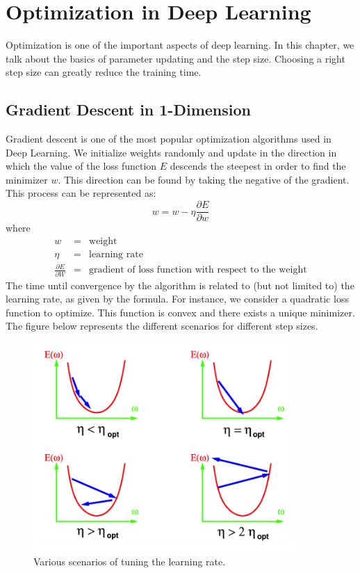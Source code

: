 
\chapter{Optimization in Deep Learning}

Optimization is one of the important aspects of deep learning. In this chapter, we talk about the basics of parameter updating and the step size. Choosing a right step size can greatly reduce the training time. 

\section{Gradient Descent in 1-Dimension}
Gradient descent is one of the most popular optimization algorithms used in Deep Learning. We initialize weights randomly and update in the direction in which the value of the loss function $E$ descends the steepest in order to find the minimizer $w$. This direction can be found by taking the negative of the gradient. This process can be represented as:
$$ w = w - \eta\frac{\partial E}{\partial w}$$
where
\begin{eqnarray*}
w &=& \text{weight}\\
\eta &=& \text{learning rate}\\
\frac{\partial E}{\partial W} &=& \text{gradient of loss function with respect to the weight}
\end{eqnarray*}
The time until convergence by the algorithm is related to (but not limited to) the learning rate, as given by the formula. For instance, we consider a quadratic loss function to optimize. This function is convex and there exists a unique minimizer. The figure below represents the different scenarios for different step sizes.

\begin{figure}[t]
\centering
\includegraphics[width=100mm]{figs/quadratic_function_to_optimise.png}
\caption{Various scenarios of tuning the learning rate.}
\end{figure}

